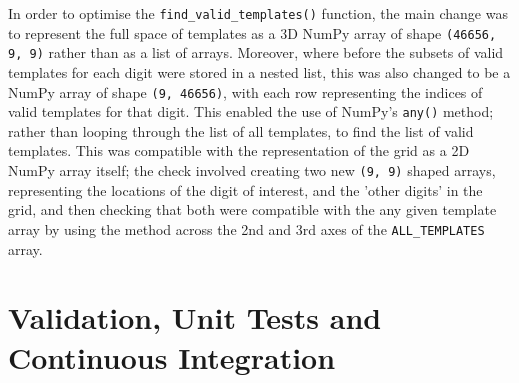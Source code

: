 \documentclass[12pt]{article}
\begin{document}
In order to optimise the \texttt{find\_valid\_templates()} function, the main change was to represent the full space of templates as a 3D NumPy array of shape \texttt{(46656, 9, 9)} rather than as a list of arrays.
Moreover, where before the subsets of valid templates for each digit were stored in a nested list, this was also changed to be a NumPy array of shape \texttt{(9, 46656)}, with each row representing the indices of valid templates for that digit.
This enabled the use of NumPy's \texttt{any()} method; rather than looping through the list of all templates, to find the list of valid templates.
This was compatible with the representation of the grid as a 2D NumPy array itself; the check involved creating two new \texttt{(9, 9)} shaped arrays, representing the locations of the digit of interest, and the 'other digits' in the grid, and then checking that both were compatible with the any given template array by using the  method across the 2nd and 3rd axes of the \texttt{ALL\_TEMPLATES} array.

\section*{Validation, Unit Tests and Continuous Integration}
\end{document}
